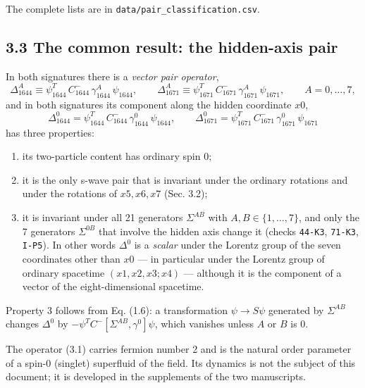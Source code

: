 \documentclass[
  10pt,
]{article}
\providecommand{\tightlist}{%
  \setlength{\itemsep}{0pt}\setlength{\parskip}{0pt}}
\begin{document}
The complete lists are in \texttt{data/pair\_classification.csv}.

\hypertarget{the-common-result-the-hidden-axis-pair}{%
\subsection{3.3 The common result: the hidden-axis
pair}\label{the-common-result-the-hidden-axis-pair}}

In both signatures there is a \emph{vector pair operator},
\[\Delta_{1644}^{A}\equiv\psi_{1644}^{T}\,C_{1644}^{-}\,\gamma_{1644}^{A}\,\psi_{1644},\qquad
\Delta_{1671}^{A}\equiv\psi_{1671}^{T}\,C_{1671}^{-}\,\gamma_{1671}^{A}\,\psi_{1671},\qquad A=0,\dots,7,\]
and in both signatures its component along the hidden coordinate \(x0\),
\[\boxed{\;\Delta_{1644}^{0}=\psi_{1644}^{T}\,C_{1644}^{-}\,\gamma_{1644}^{0}\,\psi_{1644},\qquad
\Delta_{1671}^{0}=\psi_{1671}^{T}\,C_{1671}^{-}\,\gamma_{1671}^{0}\,\psi_{1671}\;}\tag{3.1}\]
has three properties:

\begin{enumerate}
\def\labelenumi{\arabic{enumi}.}
\tightlist
\item
  its two-particle content has ordinary spin 0;
\item
  it is the only s-wave pair that is invariant under the ordinary
  rotations and under the rotations of \(x5,x6,x7\) (Sec. 3.2);
\item
  it is invariant under all 21 generators \(\Sigma^{AB}\) with
  \(A,B\in\{1,\dots,7\}\), and only the 7 generators \(\Sigma^{0B}\)
  that involve the hidden axis change it (checks \texttt{44-K3},
  \texttt{71-K3}, \texttt{I-P5}). In other words \(\Delta^{0}\) is a
  \emph{scalar} under the Lorentz group of the seven coordinates other
  than \(x0\) --- in particular under the Lorentz group of ordinary
  spacetime \((x1,x2,x3;x4)\) --- although it is the component of a
  vector of the eight-dimensional spacetime.
\end{enumerate}

Property 3 follows from Eq. (1.6): a transformation \(\psi\to S\psi\)
generated by \(\Sigma^{AB}\) changes \(\Delta^{0}\) by
\(-\psi^TC^{-}[\Sigma^{AB},\gamma^0]\psi\), which vanishes unless \(A\)
or \(B\) is 0.

The operator (3.1) carries fermion number 2 and is the natural order
parameter of a spin-0 (singlet) superfluid of the field. Its dynamics is
not the subject of this document; it is developed in the supplements of
the two manuscripts.
\end{document}
